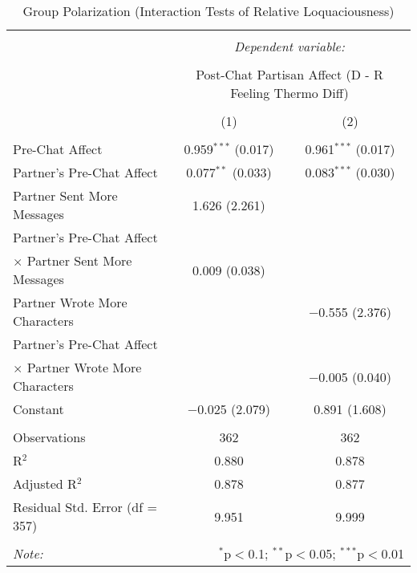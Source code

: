 
\begin{table}[H] \centering 
  \caption{Group Polarization (Interaction Tests of Relative Loquaciousness)} 
  \label{tab:s2_group_polarization_interactions} 
\begin{tabular}{@{\extracolsep{5pt}}lcc} 
\\[-1.8ex]\hline 
\hline \\[-1.8ex] 
 & \multicolumn{2}{c}{\textit{Dependent variable:}} \\ 
\cline{2-3} 
\\[-1.8ex] & \multicolumn{2}{c}{Post-Chat Partisan Affect (D - R Feeling Thermo Diff)} \\ 
\\[-1.8ex] & (1) & (2)\\ 
\hline \\[-1.8ex] 
 Pre-Chat Affect & 0.959$^{***}$ (0.017) & 0.961$^{***}$ (0.017) \\ 
  Partner's Pre-Chat Affect & 0.077$^{**}$ (0.033) & 0.083$^{***}$ (0.030) \\ 
  Partner Sent More Messages & 1.626 (2.261) &  \\ 
  Partner's Pre-Chat Affect\\$\times$ Partner Sent More Messages & 0.009 (0.038) &  \\ 
  Partner Wrote More Characters &  & $-$0.555 (2.376) \\ 
  Partner's Pre-Chat Affect\\$\times$ Partner Wrote More Characters &  & $-$0.005 (0.040) \\ 
  Constant & $-$0.025 (2.079) & 0.891 (1.608) \\ 
 \hline \\[-1.8ex] 
Observations & 362 & 362 \\ 
R$^{2}$ & 0.880 & 0.878 \\ 
Adjusted R$^{2}$ & 0.878 & 0.877 \\ 
Residual Std. Error (df = 357) & 9.951 & 9.999 \\ 
\hline 
\hline \\[-1.8ex] 
\textit{Note:}  & \multicolumn{2}{r}{$^{*}$p$<$0.1; $^{**}$p$<$0.05; $^{***}$p$<$0.01} \\ 
\end{tabular} 
\end{table} 
